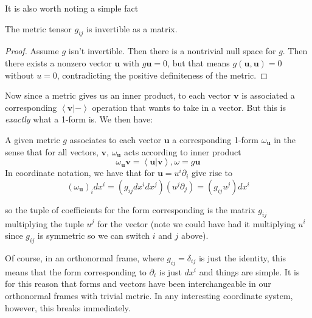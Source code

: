 \documentclass[../master.tex]{subfiles}
\begin{document}
	It is also worth noting a simple fact
	\begin{lemma}
		The metric tensor $g_{ij}$ is invertible as a matrix.
	\end{lemma}
	\begin{proof}
		Assume $g$ isn't invertible. Then there is a nontrivial null space for $g$. Then there exists a nonzero vector $\mathbf u$ with $g \mathbf u = 0$, but that means $g(\mathbf u, \mathbf u) = 0$ without $u=0$, contradicting the positive definiteness of the metric.
	\end{proof}
	Now since a metric gives us an inner product, to each vector $\mathbf v$ is associated a corresponding $\left< \mathbf v | - \right>$ operation that wants to take in a vector. But this is \emph{exactly} what a 1-form is. We then have:
	\begin{prop}
		A given metric $g$ associates to each vector $\mathbf u$ a corresponding 1-form $\omega_\mathbf{u}$ in the sense that for all vectors, $\mathbf v$, $\omega_\mathbf u$ acts according to inner product
		\begin{equation}
			\omega_\mathbf{u} \mathbf v =  \left< \mathbf u | \mathbf v \right>, \omega = g \mathbf u
		\end{equation}
		In coordinate notation, we have that for $\mathbf u = u^i \partial_i$ give rise to 
		\begin{equation}
			(\omega_\mathbf u)_i dx^i = (g_{ij} dx^i dx^j)(u^j \partial_j) = (g_{ij} u^j) dx^i
		\end{equation}
	\end{prop}
	so the tuple of coefficients for the form corresponding is the matrix $g_{ij}$ multiplying the tuple $u^j$ for the vector (note we could have had it multiplying $u^i$ since $g_{ij}$ is symmetric so we can switch $i$ and $j$ above). 
	
	Of course, in an orthonormal frame, where $g_{ij}=\delta_{ij}$ is just the identity, this means that the form corresponding to $\partial_i$ is just $dx^i$ and things are simple. It is for this reason that forms and vectors have been interchangeable in our orthonormal frames with trivial metric. In any interesting coordinate system, however, this breaks immediately. 
	
\end{document}
